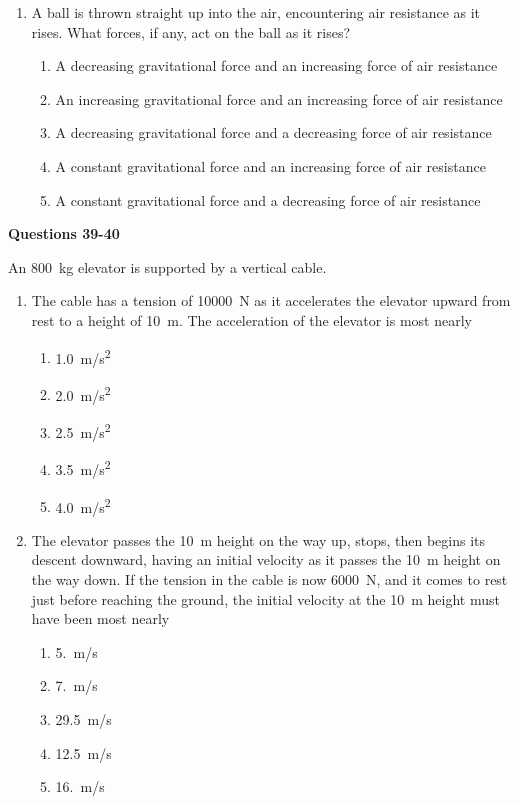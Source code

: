 \documentclass{../../oss-apphys}
\begin{document}
\begin{multicols}{2}
\begin{enumerate}[resume,leftmargin=18pt]
  \item A ball is thrown straight up into the air, encountering air resistance
    as it rises. What forces, if any, act on the ball as it rises?
    \begin{enumerate}[noitemsep,topsep=0pt,leftmargin=18pt,label=(\Alph*)]
    \item A decreasing gravitational force and an increasing force of air
      resistance
    \item An increasing gravitational force and an increasing force of air
      resistance
    \item A decreasing gravitational force and a decreasing force of air
      resistance
    \item A constant gravitational force and an increasing force of air
      resistance
    \item A constant gravitational force and a decreasing force of air
      resistance
    \end{enumerate}
  \end{enumerate}
  \columnbreak
  
  \textbf{Questions 39-40}

  An \SI{800}{\kilo\gram} elevator is supported by a vertical cable.
  \begin{center}
  \end{center}
  \begin{enumerate}[resume,leftmargin=18pt]
  \item The cable has a tension of \SI{10000}{\newton} as it accelerates the
    elevator upward from rest to a height of \SI{10}{\metre}. The acceleration
    of the elevator is most nearly
    \begin{enumerate}[noitemsep,topsep=0pt,leftmargin=18pt,label=(\Alph*)]
    \item\SI{1.0}{m/s^2}
    \item\SI{2.0}{m/s^2}
    \item\SI{2.5}{m/s^2}
    \item\SI{3.5}{m/s^2}
    \item\SI{4.0}{m/s^2}
    \end{enumerate}
    
  \item The elevator passes the \SI{10}{\metre} height on the way up, stops,
    then begins its descent downward, having an initial velocity as it passes
    the \SI{10}{\metre} height on the way down. If the tension in the cable is
    now \SI{6000}{\newton}, and it comes to rest just before reaching the
    ground, the initial velocity at the \SI{10}{\metre} height must have been
    most nearly
    \begin{enumerate}[noitemsep,topsep=0pt,leftmargin=18pt,label=(\Alph*)]
    \item\SI{5.}{m/s}
    \item\SI{7.}{m/s}
    \item\SI{29.5}{m/s}
    \item\SI{12.5}{m/s}
    \item\SI{16.}{m/s}
    \end{enumerate}


\end{enumerate}
\end{multicols}
\end{document}
